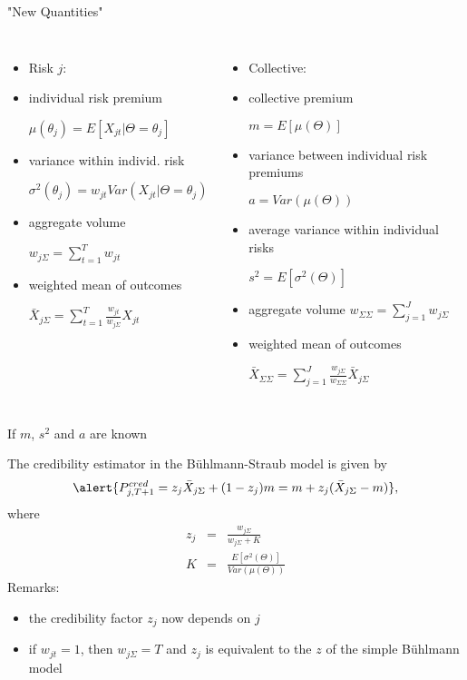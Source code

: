 \documentclass[11pt]{beamer}
\begin{document}
\begin{frame}{"New Quantities"}

\begin{columns}
\vspace{- 1.9 cm}
\begin{itemize}
\item[] Risk $j$:

\item individual risk premium

$ \mu(\theta_j)=E[X_{jt}|\Theta=\theta_j]$
\item variance within individ. risk

$\sigma^2(\theta_j)=w_{jt}Var(X_{jt}|\Theta=\theta_j)$
\item aggregate volume

$w_{j\Sigma}=\sum_{t=1}^T w_{jt}$
\item weighted mean of outcomes

$\bar{X}_{j\Sigma}=\sum_{t=1}^T \frac{w_{jt}}{w_{j\Sigma}} X_{jt}$
\end{itemize}

\begin{itemize}
\item[] Collective: 

\item collective premium

$m=E[\mu(\Theta)]$
\item variance between individual risk premiums

$a=Var(\mu(\Theta))$
\item average variance within individual risks

$s^2=E[\sigma^2(\Theta)]$
\item aggregate volume
$w_{\Sigma\Sigma}=\sum_{j=1}^{J}w_{j\Sigma}$

\item weighted mean of outcomes

$\bar{X}_{\Sigma\Sigma}=\sum_{j=1}^J \frac{w_{j\Sigma}}{w_{\Sigma\Sigma}} \bar{X}_{j\Sigma}$
\end{itemize}
\end{columns}
\end{frame}
\begin{frame}{If $m$, $s^2$ and $a$ are known}

The credibility estimator in the B{\"u}hlmann-Straub model is given by
$$\alert{P_{j,T+1}^{cred}=z_j \bar{X}_{j\Sigma}+(1-z_j)m=m+z_j(\bar{X}_{j\Sigma}-m)},$$
where
\begin{eqnarray*}
z_j & = & \frac{w_{j\Sigma}}{w_{j\Sigma}+K} \\
K & = & \frac{E[\sigma^2(\Theta)]}{Var(\mu(\Theta))}
\end{eqnarray*}
Remarks:
\begin{itemize}
\item the credibility factor $z_j$ now depends  on $j$
\item if $w_{jt}=1$, then $w_{j\Sigma}=T$ and $z_j$ is equivalent to the $z$ of the simple B{\"u}hlmann model
\end{itemize}

\end{frame}
\end{document}
